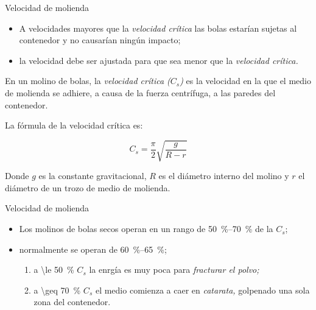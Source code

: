 \documentclass[%
spanish,
    progressbar=head,
background=dark,
subsectionpage
]{beamer}
\begin{document}
\begin{frame}{Velocidad de molienda}
    \small
    \begin{itemize}
        \item A velocidades mayores que la \textit{velocidad crítica} las bolas estarían sujetas al contenedor y no causarían ningún impacto;
        \item la velocidad debe ser ajustada para que sea menor que la \emph{velocidad crítica.} 
    \end{itemize}

    \begin{tcolorbox}[title={Velocidad crítica, \(C_s\):}]
        \small
        En un molino de bolas, la \emph{velocidad crítica (\(C_s\))} es la velocidad en la que el medio de molienda se adhiere, a causa de la fuerza centrífuga, a las paredes del contenedor.
        
        La fórmula de la velocidad crítica es:

        \begin{equation}
            C_s = \frac{\pi}{2}\sqrt{\frac{g}{R-r}}
        \end{equation}

        Donde \(g\) es la constante gravitacional, \(R\) es el diámetro interno del molino y \(r\) el diámetro de un trozo de medio de molienda. 
    \end{tcolorbox}
\end{frame}

\begin{frame}{Velocidad de molienda}
    \begin{itemize}
        \item Los molinos de bolas secos operan en un rango de \qtyrange{50}{70}{\percent} de la \(C_s\);
        \item normalmente se operan de \qtyrange{60}{65}{\percent};
        \begin{enumerate}
            \item a \qty{\le 50}{\percent} \(C_s\) la enrgía es muy poca para \emph{fracturar el polvo;}
            \item a \qty{\geq 70}{\percent} \(C_s\) el medio comienza a caer en \emph{catarata,} golpenado una sola zona del contenedor.
        \end{enumerate}
    \end{itemize} 
\end{frame}
\end{document}
